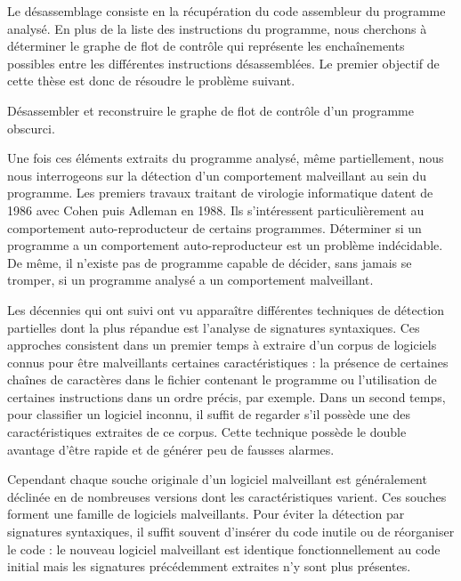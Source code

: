 Le désassemblage consiste en la récupération du code assembleur du programme analysé.
En plus de la liste des instructions du programme, nous cherchons à déterminer le graphe de flot de contrôle qui représente les enchaînements possibles entre les différentes instructions désassemblées.
Le premier objectif de cette thèse est donc de résoudre le problème suivant.

\begin{pbb}
 Désassembler et reconstruire le graphe de flot de contrôle d'un programme obscurci.
\end{pbb}

Une fois ces éléments extraits du programme analysé, même partiellement, nous nous interrogeons sur la détection d'un comportement malveillant au sein du programme.
Les premiers travaux traitant de virologie informatique datent de 1986 avec Cohen \cite{Cohen86} puis Adleman \cite{Adleman88} en 1988. Ils s'intéressent particulièrement au comportement auto-reproducteur de certains programmes. Déterminer si un programme a un comportement auto-reproducteur est un problème indécidable. De même, il n'existe pas de programme capable de décider, sans jamais se tromper, si un programme analysé a un comportement malveillant.

Les décennies qui ont suivi ont vu apparaître différentes techniques de détection partielles dont la plus répandue est l'analyse de signatures syntaxiques. Ces approches consistent dans un premier temps à extraire d'un corpus de logiciels connus pour être malveillants certaines caractéristiques : la présence de certaines chaînes de caractères dans le fichier contenant le programme ou l'utilisation de certaines instructions dans un ordre précis, par exemple. Dans un second temps, pour classifier un logiciel inconnu, il suffit de regarder s'il possède une des caractéristiques extraites de ce corpus.
Cette technique possède le double avantage d'être rapide et de générer peu de fausses alarmes.

Cependant chaque souche originale d'un logiciel malveillant est généralement déclinée en de nombreuses versions dont les caractéristiques varient. Ces souches forment une famille de logiciels malveillants. Pour éviter la détection par signatures syntaxiques, il suffit souvent d'insérer du code inutile ou de réorganiser le code : le nouveau logiciel malveillant est identique fonctionnellement au code initial mais les signatures précédemment extraites n'y sont plus présentes.

